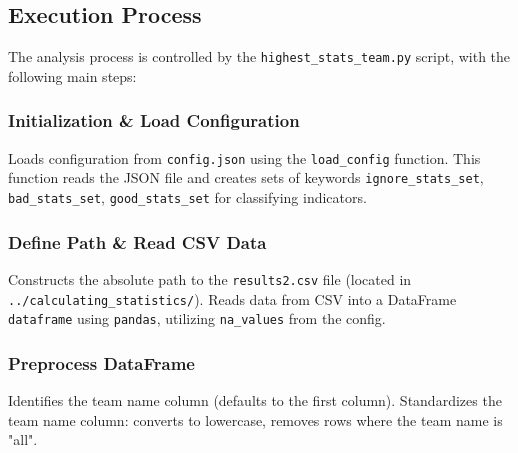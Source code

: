 \documentclass[12pt, a4paper]{report}
\begin{document}
\subsection{Execution Process}
The analysis process is controlled by the \texttt{highest\_stats\_team.py} script, with the following main steps:
\subsubsection*{Initialization & Load Configuration}
Loads configuration from \texttt{config.json} using the \texttt{load\_config} function. This function reads the JSON file and creates sets of keywords \texttt{ignore\_stats\_set}, \texttt{bad\_stats\_set}, \texttt{good\_stats\_set} for classifying indicators.

\subsubsection*{Define Path & Read CSV Data}
Constructs the absolute path to the \texttt{results2.csv} file (located in \texttt{../calculating\_statistics/}).
Reads data from CSV into a DataFrame \texttt{dataframe} using \texttt{pandas}, utilizing \texttt{na\_values} from the config.

\subsubsection*{Preprocess DataFrame}
Identifies the team name column (defaults to the first column).
Standardizes the team name column: converts to lowercase, removes rows where the team name is "all".
\end{document}
